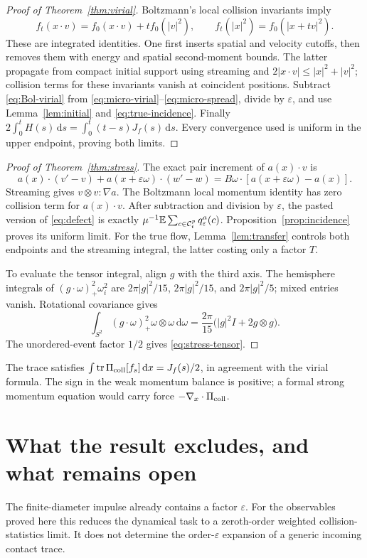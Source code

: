 \documentclass[11pt,letterpaper]{article}
\numberwithin{equation}{section}
\theoremstyle{definition}\newtheorem{assumption}[theorem]{Assumption}
\theoremstyle{remark}\newtheorem{remark}[theorem]{Remark}
\newcommand{\eps}{\varepsilon}\newcommand{\dd}{\,\mathrm d}
\begin{document}
\begin{proof}[Proof of Theorem~\ref{thm:virial}]
Boltzmann's local collision invariants imply
\begin{equation}\label{eq:Bol-virial}
 f_t(x\cdot v)=f_0(x\cdot v)+tf_0(|v|^2),\qquad
 f_t(|x|^2)=f_0(|x+tv|^2).
\end{equation}
These are integrated identities. One first inserts spatial and velocity cutoffs, then removes them with energy and spatial second-moment bounds. The latter propagate from compact initial support using streaming and $2|x\cdot v|\le|x|^2+|v|^2$; collision terms for these invariants vanish at coincident positions. Subtract \eqref{eq:Bol-virial} from \eqref{eq:micro-virial}--\eqref{eq:micro-spread}, divide by $\eps$, and use Lemma~\ref{lem:initial} and \eqref{eq:true-incidence}. Finally
$2\int_0^t H(s)\dd s=\int_0^t(t-s)J_f(s)\dd s$.
Every convergence used is uniform in the upper endpoint, proving both limits.
\end{proof}

\begin{proof}[Proof of Theorem~\ref{thm:stress}]
The exact pair increment of $a(x)\cdot v$ is
\[
 a(x)\cdot(v'-v)+a(x+\eps\omega)\cdot(w'-w)
       =B\omega\cdot[a(x+\eps\omega)-a(x)].
\]
Streaming gives $v\otimes v:\nabla a$. The Boltzmann local momentum identity has zero collision term for $a(x)\cdot v$. After subtraction and division by $\eps$, the pasted version of \eqref{eq:defect} is exactly
$\mu^{-1}\E\sum_{c\in\mathcal C_t^p}q_\eps^a(c)$.
Proposition~\ref{prop:incidence} proves its uniform limit. For the true flow, Lemma~\ref{lem:transfer} controls both endpoints and the streaming integral, the latter costing only a factor $T$.

To evaluate the tensor integral, align $g$ with the third axis. The hemisphere integrals of $(g\cdot\omega)_+^2\omega_i^2$ are $2\pi|g|^2/15$, $2\pi|g|^2/15$, and $2\pi|g|^2/5$; mixed entries vanish. Rotational covariance gives
\[
 \int_{S^2}(g\cdot\omega)_+^2\omega\otimes\omega\dd\omega
       =\frac{2\pi}{15}\bigl(|g|^2I+2g\otimes g\bigr).
\]
The unordered-event factor $1/2$ gives \eqref{eq:stress-tensor}.
\end{proof}
The trace satisfies $\int\operatorname{tr}\Pcoll[f_s]\dd x=J_f(s)/2$, in agreement with the virial formula. The sign in the weak momentum balance is positive; a formal strong momentum equation would carry force $-\nabla_x\cdot\Pi_{\mathrm{coll}}$.

\section{What the result excludes, and what remains open}\label{sec:scope}
The finite-diameter impulse already contains a factor $\eps$. For the observables proved here this reduces the dynamical task to a zeroth-order weighted collision-statistics limit. It does not determine the order-$\eps$ expansion of a generic incoming contact trace.
\end{document}
